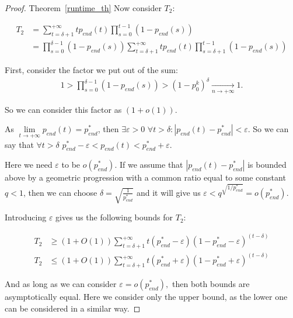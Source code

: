 \documentclass{article}
\begin{document}
\begin{proof}{Theorem~\ref{runtime_th}}
Now consider $T_2$:

\begin{align*}
  T_2 &= \sum\limits_{t = \delta + 1}^{+\infty} t p_{end}(t) \prod\limits_{s = 0}^{t - 1} (1 - p_{end}(s)) \\
      &= \prod\limits_{s = 0}^{\delta - 1} (1 - p_{end}(s)) \sum\limits_{t = \delta + 1}^{+\infty} t p_{end}(t) \prod\limits_{s = \delta + 1}^{t - 1} (1 - p_{end}(s))
\end{align*}

First, consider the factor we put out of the sum:
\begin{align*}
  1 > \prod\limits_{s = 0}^{\delta - 1} (1 - p_{end}(s)) > (1 - p_0^k)^\delta \xrightarrow[n \to +\infty]{} 1.
\end{align*}

So we can consider this factor as $(1 + o(1)).$

As $\lim\limits_{t \to +\infty} p_{end}(t) = p_{end}^*$, then $\exists \varepsilon > 0$ $\forall t > \delta: |p_{end}(t) - p_{end}^*| < \varepsilon$. So we can say that $\forall t > \delta$ $p_{end}^* - \varepsilon < p_{end}(t) < p_{end}^* + \varepsilon.$

Here we need $\varepsilon$ to be $o(p_{end}^*).$ If we assume that $|p_{end}(t) - p_{end}^*|$ is bounded above by a geometric progression with a common ratio equal to some constant $q < 1$, then we can choose $\delta = \sqrt{\frac{1}{p_{end}^*}}$ and it will give us $\varepsilon < q^{\sqrt{1/p_{end}^*}}= o(p_{end}^*).$

Introducing $\varepsilon$ gives us the following bounds for $T_2:$

\begin{align*}
T_2 &\ge (1 + O(1)) \sum\limits_{t = \delta + 1}^{+\infty} t (p_{end}^* - \varepsilon) (1 - p_{end}^* - \varepsilon)^{(t - \delta)} \\
T_2 &\le (1 + O(1)) \sum\limits_{t = \delta + 1}^{+\infty} t (p_{end}^* + \varepsilon) (1 - p_{end}^* + \varepsilon)^{(t - \delta)}
\end{align*}

And as long as we can consider $\varepsilon = o(p_{end}^*),$ then both bounds are asymptotically equal. Here we consider only the upper bound, as the lower one can be considered in a similar way.


\end{proof}
\end{document}
